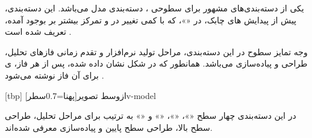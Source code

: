  یکی از دسته‌بندی‌های مشهور برای سطوحی
، دسته‌بندی مدل  می‌باشد. این دسته‌بندی، پیش از پیدایش
‌های چابک، در  «»، که با کمی
تغییر در   و تمرکز بیشتر بر 
بوجود آمده، تعریف شده است .

وجه تمایز سطوح در این دسته‌بندی، مراحل تولید نرم‌افزار و تقدم زمانی
فازهای تحلیل، طراحی و پیاده‌سازی می‌باشد. همانطور که در شکل
 نشان داده شده، پس از هر فاز، ی برای
 آن فاز نوشته می‌شود .

[tbp]
‌ازوسط
‌تصویر[پهنا=0.7‌سطر]{v-model}

در این دسته‌بندی چهار سطح «»، «»،
«» و «» به ترتیب برای مراحل تحلیل،
طراحی سطح بالا، طراحی سطح پایین و پیاده‌سازی معرفی شده‌اند.

